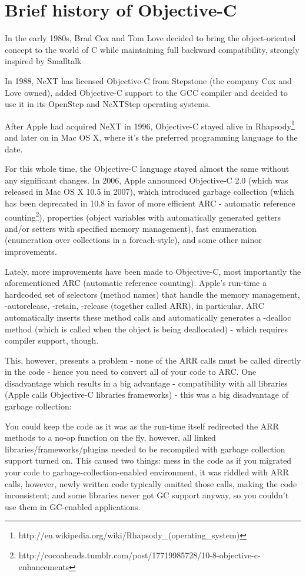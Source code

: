\documentclass[a4paper, 11pt, fleqn]{book}
\begin{document}
\section{Brief history of Objective-C}

In the early 1980s, Brad Cox and Tom Love decided to bring the object-oriented concept to the world of C while maintaining full backward compatibility, strongly inspired by Smalltalk

In 1988, NeXT has licensed Objective-C from Stepstone (the company Cox and Love owned), added Objective-C support to the GCC compiler and decided to use it in its OpenStep and NeXTStep operating systems.

After Apple had acquired NeXT in 1996, Objective-C stayed alive in Rhapsody\footnote{http://en.wikipedia.org/wiki/Rhapsody\_(operating\_system)} and later on in Mac OS X, where it's the preferred programming language to the date.

For this whole time, the Objective-C language stayed almost the same without any significant changes. In 2006, Apple announced Objective-C 2.0 (which was released in Mac OS X 10.5 in 2007), which introduced garbage collection (which has been deprecated in 10.8 in favor of more efficient ARC - automatic reference counting\footnote{http://cocoaheads.tumblr.com/post/17719985728/10-8-objective-c-enhancements}), properties (object variables with automatically generated getters and/or setters with specified memory management), fast enumeration (enumeration over collections in a foreach-style), and some other minor improvements.

Lately, more improvements have been made to Objective-C, most importantly the aforementioned ARC (automatic reference counting). Apple's run-time a hardcoded set of selectors (method names) that handle the memory management, -autorelease, -retain, -release (together called ARR), in particular. ARC automatically inserts these method calls and automatically generates a -dealloc method (which is called when the object is being deallocated) - which requires compiler support, though.

This, however, presents a problem - none of the ARR calls must be called directly in the code - hence you need to convert all of your code to ARC\@. One disadvantage which results in a big advantage - compatibility with all libraries (Apple calls Objective-C libraries frameworks) - this was a big disadvantage of garbage collection: 

You could keep the code as it was as the run-time itself redirected the ARR methods to a no-op function on the fly, however, all linked libraries/frameworks/plugins needed to be recompiled with garbage collection support turned on. This caused two things: mess in the code as if you migrated your code to garbage-collection-enabled environment, it was riddled with ARR calls, however, newly written code typically omitted those calls, making the code inconsistent; and some libraries never got GC support anyway, so you couldn't use them in GC-enabled applications.
\end{document}
